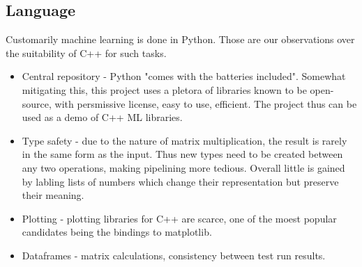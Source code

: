 \documentclass{article}
\begin{document}
\subsection{Language}
Customarily machine learning is done in Python.
Those are our observations over the suitability of C++ for such tasks.
\begin{itemize}
\item{Central repository - Python "comes with the batteries included".
                           Somewhat mitigating this, this project uses a pletora of libraries known to be open-source, with persmissive license, easy to use, efficient.
                           The project thus can be used as a demo of C++ ML libraries.
}
\item{Type safety - due to the nature of matrix multiplication, the result is rarely in the same form as the input.
                    Thus new types need to be created between any two operations, making pipelining more tedious.
                    Overall little is gained by labling lists of numbers which change their representation but preserve their meaning.}
\item{Plotting - plotting libraries for C++ are scarce, one of the moest popular candidates being the bindings to matplotlib.}
\item{Dataframes - matrix calculations, consistency between test run results.}
\end{itemize}


\printbibliography
\end{document}
